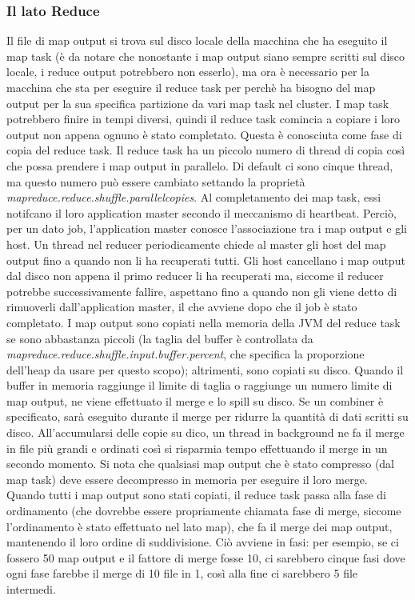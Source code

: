 \subsubsection{Il lato Reduce} 
Il file di map output si trova sul disco locale della macchina che ha eseguito il map task (è da notare che nonostante i map output siano sempre scritti sul disco locale, i reduce output potrebbero non esserlo), ma ora è necessario per la macchina che sta per eseguire il reduce task per perchè ha bisogno del map output per la sua specifica partizione da vari map task nel cluster. I map task potrebbero finire in tempi diversi, quindi il reduce task comincia a copiare i loro output non appena ognuno è stato completato. Questa è conosciuta come fase di copia del reduce task. Il reduce task ha un piccolo numero di thread di copia così che possa prendere i map output in parallelo. Di default ci sono cinque thread, ma questo numero può essere cambiato settando la proprietà \textit{mapreduce.reduce.shuffle.parallelcopies}. Al completamento dei map task, essi notifcano il loro application master secondo il meccanismo di heartbeat. Perciò, per un dato job, l'application master conosce l'associazione tra i map output e gli host. Un thread nel reducer periodicamente chiede al master gli host del map output fino a quando non li ha recuperati tutti. Gli host cancellano i map output dal disco non appena il primo reducer li ha recuperati ma, siccome il reducer potrebbe successivamente fallire, aspettano fino a quando non gli viene detto di rimuoverli dall'application master, il che avviene dopo che il job è stato completato. I map output sono copiati nella memoria della JVM del reduce task se sono abbastanza piccoli (la taglia del buffer è controllata da \textit{mapreduce.reduce.shuffle.input.buffer.percent}, che specifica la proporzione dell'heap da usare per questo scopo); altrimenti, sono copiati su disco. Quando il buffer in memoria raggiunge il limite di taglia o raggiunge un numero limite di map output, ne viene effettuato il merge e lo spill su disco. Se un combiner è specificato, sarà eseguito durante il merge per ridurre la quantità di dati scritti su disco. All'accumularsi delle copie su dico, un thread in background ne fa il merge in file più grandi e ordinati così si risparmia tempo effettuando il merge in un secondo momento. Si nota che qualsiasi map output che è stato compresso (dal map task) deve essere decompresso in memoria per eseguire il loro merge. Quando tutti i map output sono stati copiati, il reduce task passa alla fase di ordinamento (che dovrebbe essere propriamente chiamata fase di merge, siccome l'ordinamento è stato effettuato nel lato map), che fa il merge dei map output, mantenendo il loro ordine di suddivisione. Ciò avviene in fasi: per esempio, se ci fossero 50 map output e il fattore di merge fosse 10, ci sarebbero cinque fasi dove ogni fase farebbe il merge di 10 file in 1, così alla fine ci sarebbero 5 file intermedi.

